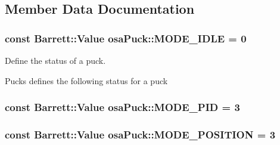 \subsection{Member Data Documentation}
\hypertarget{classosa_puck_ad650adededab3406a2afb64c382b4b6b}{}
\subsubsection[{M\+O\+D\+E\+\_\+\+I\+D\+L\+E}]{\setlength{\rightskip}{0pt plus 5cm}const {\bf Barrett\+::\+Value} osa\+Puck\+::\+M\+O\+D\+E\+\_\+\+I\+D\+L\+E = 0\hspace{0.3cm}{\ttfamily [static]}}\label{classosa_puck_ad650adededab3406a2afb64c382b4b6b}


Define the status of a puck. 

Pucks defines the following status for a puck \hypertarget{classosa_puck_a60ac2cf88c6c517f01db4569843a5e1a}{}
\subsubsection[{M\+O\+D\+E\+\_\+\+P\+I\+D}]{\setlength{\rightskip}{0pt plus 5cm}const {\bf Barrett\+::\+Value} osa\+Puck\+::\+M\+O\+D\+E\+\_\+\+P\+I\+D = 3\hspace{0.3cm}{\ttfamily [static]}}\label{classosa_puck_a60ac2cf88c6c517f01db4569843a5e1a}
\hypertarget{classosa_puck_a7bbba0c7e8896c0d8b6da42f60d7ec0d}{}
\subsubsection[{M\+O\+D\+E\+\_\+\+P\+O\+S\+I\+T\+I\+O\+N}]{\setlength{\rightskip}{0pt plus 5cm}const {\bf Barrett\+::\+Value} osa\+Puck\+::\+M\+O\+D\+E\+\_\+\+P\+O\+S\+I\+T\+I\+O\+N = 3\hspace{0.3cm}{\ttfamily [static]}}\label{classosa_puck_a7bbba0c7e8896c0d8b6da42f60d7ec0d}
\hypertarget{classosa_puck_aabdc001b07826137272fb01ffb200aac}{}
